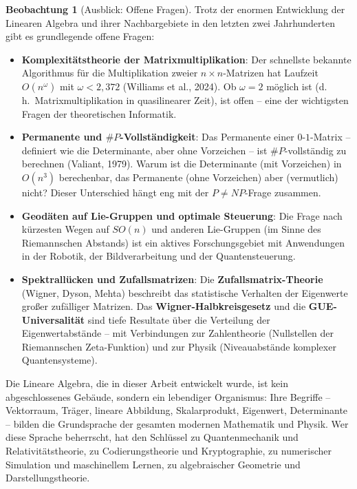 ﻿\documentclass[a4paper,12pt]{report}
\theoremstyle{definition}
\newtheorem{beobachtung}{Beobachtung}
\begin{document}
\begin{beobachtung}[Ausblick: Offene Fragen]
    Trotz der enormen Entwicklung der Linearen Algebra und ihrer
    Nachbargebiete in den letzten zwei Jahrhunderten gibt es
    grundlegende offene Fragen:
    \begin{itemize}
        \item[-] \textbf{Komplexitätstheorie der Matrixmultiplikation}:
              Der schnellste bekannte Algorithmus für die
              Multiplikation zweier $n \times n$-Matrizen hat
              Laufzeit $O(n^\omega)$ mit $\omega < 2{,}372$ (Williams et al., 2024).
              Ob $\omega = 2$ möglich ist (d.\,h.\ Matrixmultiplikation
              in quasilinearer Zeit), ist offen -- eine der wichtigsten
              Fragen der theoretischen Informatik.
        \item[-] \textbf{Permanente und $\#P$-Voll\-stän\-dig\-keit}:
              Das Permanente einer $0$-$1$-Matrix -- definiert wie
              die Determinante, aber ohne Vorzeichen --
              ist $\#P$-vollständig zu berechnen (Valiant, 1979).
              Warum ist die Determinante (mit Vorzeichen) in $O(n^3)$
              berechenbar, das Permanente (ohne Vorzeichen) aber
              (vermutlich) nicht? Dieser Unterschied hängt eng mit
              der $P \neq NP$-Frage zusammen.
        \item[-] \textbf{Geodäten auf Lie-Gruppen und optimale
              Steuerung}: Die Frage nach kürzesten Wegen auf $SO(n)$
              und anderen Lie-Gruppen (im Sinne des Riemannschen
              Abstands) ist ein aktives Forschungsgebiet mit
              Anwendungen in der Robotik, der Bildverarbeitung
              und der Quantensteuerung.
        \item[-] \textbf{Spektrallücken und Zufallsmatrizen}:
              Die \textbf{Zufallsmatrix-Theorie} (Wigner, Dyson,
              Mehta) beschreibt das statistische Verhalten der
              Eigenwerte großer zufälliger Matrizen. Das
              \textbf{Wigner-Halbkreisgesetz} und die
              \textbf{GUE-Universalität} sind tiefe Resultate
              über die Verteilung der Eigenwertabstände --
              mit Verbindungen zur Zahlentheorie (Nullstellen
              der Riemannschen Zeta-Funktion) und zur Physik
              (Niveauabstände komplexer Quantensysteme).
    \end{itemize}
\end{beobachtung}

Die Lineare Algebra, die in dieser Arbeit entwickelt wurde, ist
kein abgeschlossenes Gebäude, sondern ein lebendiger Organismus:
Ihre Begriffe -- Vektorraum, Träger, lineare Abbildung,
Skalarprodukt, Eigenwert, Determinante -- bilden die Grundsprache
der gesamten modernen Mathematik und Physik. Wer diese Sprache
beherrscht, hat den Schlüssel zu Quantenmechanik und
Relativitätstheorie, zu Codierungstheorie und Kryptographie,
zu numerischer Simulation und maschinellem Lernen,
zu algebraischer Geometrie und Darstellungstheorie.
\end{document}
